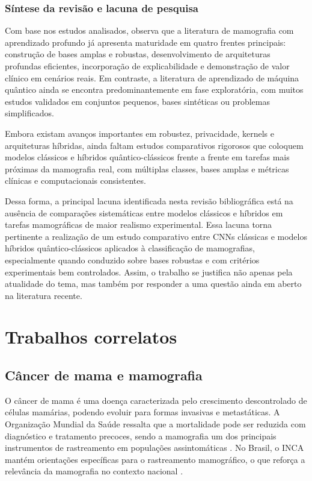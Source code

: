 \documentclass[
    12pt,
    openright,
    oneside,
    a4paper,
    english,
    brazil
]{abntex2}
\begin{document}
\subsection{Síntese da revisão e lacuna de pesquisa}

Com base nos estudos analisados, observa que a literatura de mamografia com aprendizado profundo já apresenta maturidade em quatro frentes principais: construção de bases amplas e robustas, desenvolvimento de arquiteturas profundas eficientes, incorporação de explicabilidade e demonstração de valor clínico em cenários reais. Em contraste, a literatura de aprendizado de máquina quântico ainda se encontra predominantemente em fase exploratória, com muitos estudos validados em conjuntos pequenos, bases sintéticas ou problemas simplificados.

Embora existam avanços importantes em robustez, privacidade, kernels e arquiteturas híbridas, ainda faltam estudos comparativos rigorosos que coloquem modelos clássicos e híbridos quântico-clássicos frente a frente em tarefas mais próximas da mamografia real, com múltiplas classes, bases amplas e métricas clínicas e computacionais consistentes.

Dessa forma, a principal lacuna identificada nesta revisão bibliográfica está na ausência de comparações sistemáticas entre modelos clássicos e híbridos em tarefas mamográficas de maior realismo experimental. Essa lacuna torna pertinente a realização de um estudo comparativo entre CNNs clássicas e modelos híbridos quântico-clássicos aplicados à classificação de mamografias, especialmente quando conduzido sobre bases robustas e com critérios experimentais bem controlados. Assim, o trabalho se justifica não apenas pela atualidade do tema, mas também por responder a uma questão ainda em aberto na literatura recente.


\chapter{Trabalhos correlatos}
\label{sec:referencial}

\section{Câncer de mama e mamografia}

O câncer de mama é uma doença caracterizada pelo crescimento descontrolado de células mamárias, podendo evoluir para formas invasivas e metastáticas. A Organização Mundial da Saúde ressalta que a mortalidade pode ser reduzida com diagnóstico e tratamento precoces, sendo a mamografia um dos principais instrumentos de rastreamento em populações assintomáticas \cite{WHO2025BreastCancer}. No Brasil, o INCA mantém orientações específicas para o rastreamento mamográfico, o que reforça a relevância da mamografia no contexto nacional \cite{INCA2025Rastreamento}.
\end{document}
